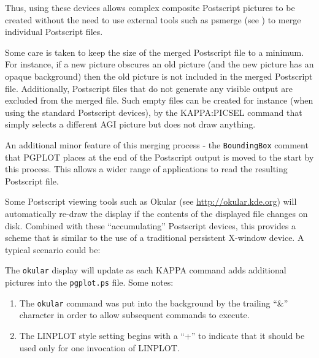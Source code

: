 \documentclass[twoside,11pt,nolof]{starlink}
\begin{document}
Thus, using these devices allows complex composite Postscript pictures to
be created without the need to use external tools such as psmerge (see
) to merge individual Postscript files.

Some care is taken to keep the size of the merged Postscript file to a
minimum. For instance, if a new picture obscures an old picture (and the
new picture has an opaque background) then the old picture is not
included in the merged Postscript file. Additionally, Postscript files
that do not generate any visible output are excluded from the merged
file. Such empty files can be created for instance (when using the
standard Postscript devices), by the KAPPA:PICSEL command that simply
selects a different AGI picture but does not draw anything.

An additional minor feature of this merging process - the \texttt{BoundingBox}
comment that PGPLOT places at the end of the Postscript output is moved
to the start by this process. This allows a wider range of applications
to read the resulting Postscript file.

Some Postscript viewing tools such as Okular (see \url{http://okular.kde.org}) will
automatically re-draw the display if the contents of the displayed file
changes on disk. Combined with these ``accumulating'' Postscript devices,
this provides a scheme that is similar to the use of a traditional
persistent X-window device. A typical scenario could be:

\begin{terminalv}
\end{terminalv}

The \texttt{okular} display will update as each KAPPA command adds additional
pictures into the \texttt{pgplot.ps} file. Some notes:

\begin{enumerate}
\item The \texttt{okular} command was put into the background by the trailing
``\&'' character in order to allow subsequent commands to execute.
\item The LINPLOT style setting begins with a ``+'' to indicate that it
should be used only for one invocation of LINPLOT.
\end{enumerate}
\end{document}
